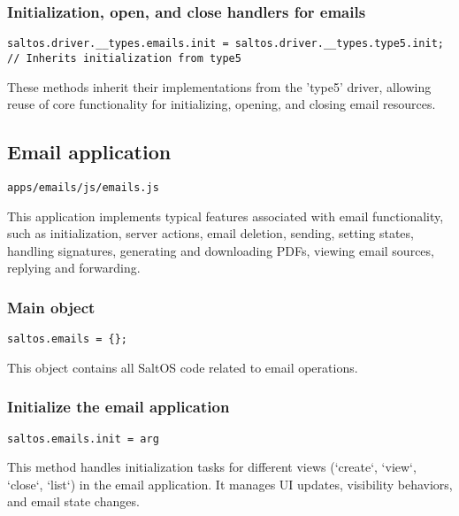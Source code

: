 \documentclass[a4paper]{article}
\begin{document}
\hypertarget{toc52}{}
\subsubsection{Initialization, open, and close handlers for emails}

\begin{lstlisting}
saltos.driver.__types.emails.init = saltos.driver.__types.type5.init; // Inherits initialization from type5
\end{lstlisting}

These methods inherit their implementations from the 'type5' driver, allowing
reuse of core functionality for initializing, opening, and closing email resources.

\hypertarget{toc53}{}
\subsection{Email application}

\begin{lstlisting}
apps/emails/js/emails.js
\end{lstlisting}

This application implements typical features associated with email functionality,
such as initialization, server actions, email deletion, sending, setting states,
handling signatures, generating and downloading PDFs, viewing email sources, replying
and forwarding.

\hypertarget{toc54}{}
\subsubsection{Main object}

\begin{lstlisting}
saltos.emails = {};
\end{lstlisting}

This object contains all SaltOS code related to email operations.

\hypertarget{toc55}{}
\subsubsection{Initialize the email application}

\begin{lstlisting}
saltos.emails.init = arg
\end{lstlisting}

This method handles initialization tasks for different views (`create`, `view`, `close`, `list`)
in the email application. It manages UI updates, visibility behaviors, and email state changes.
\end{document}
